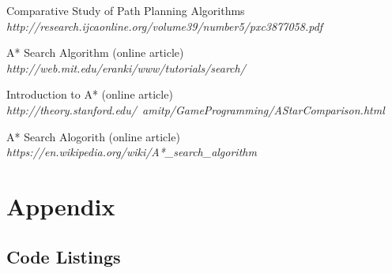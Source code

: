 \documentclass[11pt, a4paper]{article}
\begin{document}
\begin{thebibliography}{}
\par{Comparative Study of Path Planning Algorithms}
\\
\textit{http://research.ijcaonline.org/volume39/number5/pxc3877058.pdf}

\par{A* Search Algorithm (online article)}
\\
\textit{http://web.mit.edu/eranki/www/tutorials/search/}



\par{Introduction to A* (online article)}
\\
\textit{http://theory.stanford.edu/~amitp/GameProgramming/AStarComparison.html}



\par{A* Search Alogorith (online article)}
\\
\textit{https://en.wikipedia.org/wiki/A*\_search\_algorithm}




\end{thebibliography}

\newpage
\section*{Appendix}
\subsection{Code Listings}
\label{Code}
















\end{document}
